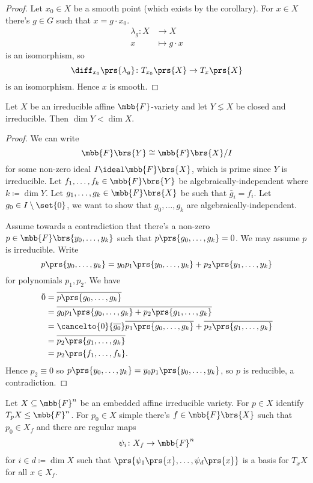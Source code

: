 \documentclass[10pt,a4paper,twoside,openany,hidelinks]{book}
\begin{document}
\begin{proof}
Let $x_0 \in X$ be a smooth point (which exists by the corollary).
For $x \in X$ there's $g \in G$ such that $x = g \cdot x_0$.
\begin{align*}
\lambda_g \colon X &\to X \\
x &\mapsto g \cdot x
\end{align*}
is an isomorphism, so
\[\diff_{x_0}\prs{\lambda_g} \colon T_{x_0}\prs{X} \to T_x\prs{X}\]
is an isomorphism.
Hence $x$ is smooth.
\end{proof}

\begin{proposition}
Let $X$ be an irreducible affine $\mbb{F}$-variety and let $Y \lneq X$ be closed and irreducible. Then $\dim Y < \dim X$.
\end{proposition}

\begin{proof}
We can write
\[\mbb{F}\brs{Y} \cong \mbb{F}\brs{X} / I\]
for some non-zero ideal $I \ideal \mbb{F}\brs{X}$, which is prime since $Y$ is irreducible.
Let $f_1, \ldots, f_k \in \mbb{F}\brs{Y}$ be algebraically-independent where $k \coloneqq \dim Y$.
Let $g_1, \ldots, g_k \in \mbb{F}\brs{X}$ be such that $\bar{g}_i = f_i$.
Let $g_0 \in I \setminus \set{0}$, we want to show that $g_0, \ldots, g_k$ are algebraically-independent.

Assume towards a contradiction that there's a non-zero $p \in \mbb{F}\brs{y_0, \ldots, y_k}$ such that $p\prs{g_0, \ldots, g_k} = 0$. We may assume $p$ is irreducible. Write
\[p\prs{y_0, \ldots, y_k} = y_0 p_1\prs{y_0, \ldots, y_k} + p_2\prs{y_1, \ldots, y_k}\]
for polynomials $p_1, p_2$.
We have
\begin{align*}
\bar{0} &= \overline{p\prs{g_0, \ldots, g_k}}
\\&= \overline{g_0 p_1\prs{g_0, \ldots, g_k} + p_2\prs{g_1, \ldots, g_k}}
\\&= \cancelto{0}{\overline{g_0}} \overline{p_1\prs{g_0, \ldots, g_k}} + \overline{p_2\prs{g_1, \ldots, g_k}}
\\&= \overline{p_2\prs{g_1, \ldots, g_k}}
\\&= p_2\prs{f_1, \ldots, f_k} \text{.}
\end{align*}
Hence $p_2 \equiv 0$ so $p\prs{y_0, \ldots, y_k} = y_0 p_1\prs{y_0, \ldots, y_k}$, so $p$ is reducible, a contradiction.
\end{proof}

\begin{lemma} \label{lemma:charts}
Let $X \subseteq \mbb{F}^n$ be an embedded affine irreducible variety. For $p \in X$ identify $T_p X \leq \mbb{F}^n$. For $p_0 \in X$ simple there's $f \in \mbb{F}\brs{X}$ such that $p_0 \in X_f$ and there are regular maps
\begin{align*}
\psi_i \colon X_f \to \mbb{F}^n
\end{align*}
for $i \in d \coloneqq \dim X$ such that
$\prs{\psi_1\prs{x} ,\ldots, \psi_d\prs{x}}$ is a basis for $T_x X$ for all $x \in X_f$.
\end{lemma}
\end{document}
